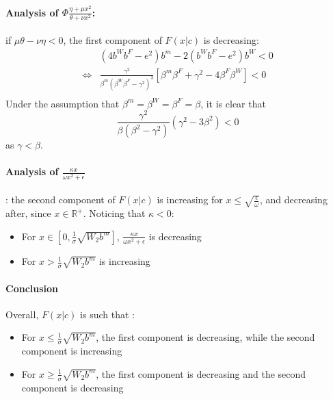\paragraph{Analysis of $\Phi \frac{\eta + \mu x^2}{\theta + \nu x^2}$:} if $\mu \theta - \nu \eta<0$, the first component of $F(x|c)$ is decreasing:
\begin{align*}
&(4b^Wb^F - e^2)b^m -2(b^Wb^F-e^2)b^W<0\\
\iff & \frac{\gamma^2}{\beta^m (\beta^W\beta^F - \gamma^2)^3}\left[ \beta^m \beta^F + \gamma^2 -4\beta^F \beta^W \right]<0\\
\end{align*}
Under the assumption that $\beta^m = \beta^W = \beta^F = \beta$, it is clear that 
$$
\frac{\gamma^2}{\beta(\beta^2 - \gamma^2)}(\gamma^2 - 3 \beta^2) <0
$$
as $\gamma < \beta$. 
\paragraph{Analysis of $\frac{\kappa x}{\omega x^2 + \epsilon}$}: the second component of $F(x|c)$ is increasing for $x \leq \sqrt{\frac{\epsilon}{\omega}}$, and decreasing after, since $x\in \mathbb{R}^+$. Noticing that $\kappa <0$: 
\begin{itemize}
    \item For $x \in \left[0,\frac{1}{\sigma}\sqrt{W_2 b^m} \right]$, $\frac{\kappa x}{\omega x^2 + \epsilon}$ is decreasing
    \item For $x>\frac{1}{\sigma}\sqrt{W_2 b^m}$ is increasing
\end{itemize}

\paragraph{Conclusion}
Overall, $F(x|c)$ is such that : 
\begin{itemize}
    \item For $x \leq \frac{1}{\sigma}\sqrt{W_2 b^m}$, the first component is decreasing, while the second component is increasing
    \item For $x \geq \frac{1}{\sigma}\sqrt{W_2 b^m}$, the first component is decreasing and the second component is decreasing
\end{itemize}

